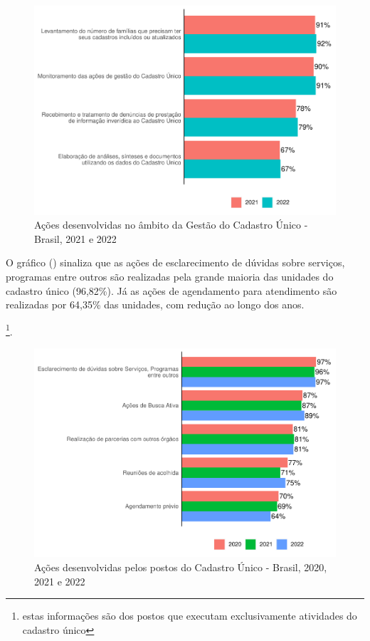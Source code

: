 \documentclass[
  brazilian]{report}
\begin{document}
\begin{figure}
\includegraphics{Censo-SUAS-2022_files/figure-latex/gestao_cad-1} \caption[Ações desenvolvidas no âmbito da Gestão do Cadastro Único - Brasil, 2021 e 2022]{Ações desenvolvidas no âmbito da Gestão do Cadastro Único - Brasil, 2021 e 2022}\label{fig:gestao_cad}
\end{figure}

O gráfico () sinaliza que as ações de esclarecimento
de dúvidas sobre serviços, programas entre outros são realizadas pela
grande maioria das unidades do cadastro único (96,82\%). Já as ações de
agendamento para atendimento são realizadas por 64,35\% das unidades,
com redução ao longo dos anos.

\footnote{estas informações são dos postos que executam exclusivamente 
atividades do cadastro único}.

\begin{figure}
\includegraphics{Censo-SUAS-2022_files/figure-latex/acoes_cad-1} \caption[Ações desenvolvidas pelos postos do Cadastro Único - Brasil, 2020, 2021 e 2022]{Ações desenvolvidas pelos postos do Cadastro Único - Brasil, 2020, 2021 e 2022}\label{fig:acoes_cad}
\end{figure}
\end{document}
